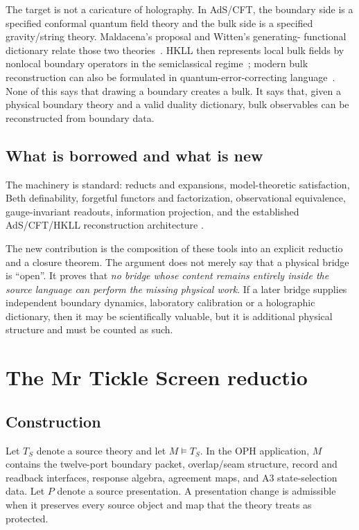 \documentclass[10pt,a4paper]{article}
\theoremstyle{definition}
\theoremstyle{remark}
\begin{document}
The target is not a caricature of holography.  In AdS/CFT, the boundary side
is a specified conformal quantum field theory and the bulk side is a specified
gravity/string theory.  Maldacena's proposal and Witten's generating-
functional dictionary relate those two theories~\cite{Maldacena1997,Witten1998}.
HKLL then represents local bulk fields by nonlocal boundary operators in the
semiclassical regime~\cite{HKLL2006}; modern bulk reconstruction can also be
formulated in quantum-error-correcting language~\cite{ADH2015}.  None of this
says that drawing a boundary creates a bulk.  It says that, given a physical
boundary theory and a valid duality dictionary, bulk observables can be
reconstructed from boundary data.

\subsection{What is borrowed and what is new}

The machinery is standard: reducts and expansions, model-theoretic
satisfaction, Beth definability, forgetful functors and factorization,
observational equivalence, gauge-invariant readouts, information projection,
and the established AdS/CFT/HKLL reconstruction architecture
\cite{Beth1953,Hodges1993,ChangKeisler,KullbackLeibler,Csiszar1975,Jaynes1957,Maldacena1997,Witten1998,HKLL2006,ADH2015}.

The new contribution is the composition of these tools into an explicit
reductio and a closure theorem.  The argument does not merely say that a
physical bridge is ``open''.  It proves that \emph{no bridge whose content
remains entirely inside the source language can perform the missing physical
work}.  If a later bridge supplies independent boundary dynamics, laboratory
calibration or a holographic dictionary, then it may be scientifically
valuable, but it is additional physical structure and must be counted as such.

\section{The Mr Tickle Screen reductio}
\label{sec:tickle}

\subsection{Construction}

Let \(T_S\) denote a source theory and let \(M\models T_S\).  In the OPH
application, \(M\) contains the twelve-port boundary packet, overlap/seam
structure, record and readback interfaces, response algebra, agreement maps,
and A3 state-selection data.  Let \(P\) denote a source presentation.  A
presentation change is admissible when it preserves every source object and
map that the theory treats as protected.
\end{document}
